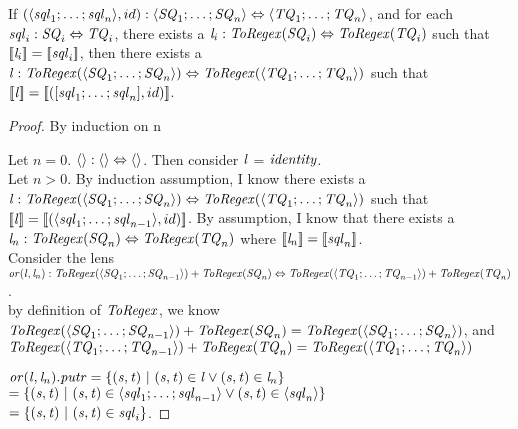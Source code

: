 \begin{lemma}
\label{lem:id-dnf}
If $(\langle\mathit{sql}_1 ; \ldots ; \mathit{sql}_n\rangle,id) :
\langle\mathit{SQ}_1 ; \ldots ; \mathit{SQ}_n\rangle \Leftrightarrow \langle\mathit{TQ}_1 ; \ldots ; \mathit{TQ}_n\rangle$,
and for each $\mathit{sql}_i : \mathit{SQ}_i \Leftrightarrow \mathit{TQ}_i$,
there exists a $\mathit{l}_i : \mathit{ToRegex}(\mathit{SQ}_i) \Leftrightarrow \mathit{ToRegex}(\mathit{TQ}_i)$ such that
$[ \! [\mathit{l}_i] \! ] = [ \! [\mathit{sql}_i] \! ]$,
then there exists a $\mathit{l} : \mathit{ToRegex}(\langle\mathit{SQ}_1 ; \ldots ; \mathit{SQ}_n\rangle) \Leftrightarrow \mathit{ToRegex}(\langle\mathit{TQ}_1 ; \ldots ; \mathit{TQ}_n\rangle)$ such that $[ \! [\mathit{l}] \! ] = [ \! [([\mathit{sql}_1 ; \ldots ; \mathit{sql}_n],id)] \! ]$.
\begin{proof}
By induction on n

Let $n=0$.
$\langle\rangle : \langle\rangle \Leftrightarrow \langle\rangle$.  Then consider $\mathit{l}$ = $\mathit{identity}$.
\\

Let $n>0$.
By induction assumption, I know
there exists a $\mathit{l} : \mathit{ToRegex}(\langle\mathit{SQ}_1 ; \ldots ; \mathit{SQ}_n\rangle) \Leftrightarrow \mathit{ToRegex}(\langle\mathit{TQ}_1 ; \ldots ; \mathit{TQ}_n\rangle)$ such that
$[ \! [\mathit{l}] \! ] = [ \! [(\langle\mathit{sql}_1 ; \ldots ; \mathit{sql}_{n-1}\rangle,id)] \! ]$.
By assumption, I know that there exists a $\mathit{l}_{n} : \mathit{ToRegex}(\mathit{SQ}_{n}) \Leftrightarrow \mathit{ToRegex}(\mathit{TQ}_{n})$
where $[ \! [\mathit{l}_{n}] \! ]=[ \! [\mathit{sql}_{n}] \! ]$.\\
Consider the lens $\mathit{or}(\mathit{l},\mathit{l}_{n}) : \mathit{ToRegex}(\langle\mathit{SQ}_1 ; \ldots ; \mathit{SQ}_{n-1}\rangle)+\mathit{ToRegex}(\mathit{SQ}_{n}) \Leftrightarrow \mathit{ToRegex}(\langle\mathit{TQ}_1 ; \ldots ; \mathit{TQ}_{n-1}\rangle)+\mathit{ToRegex}(\mathit{TQ}_{n})$.\\
by definition of $\mathit{ToRegex}$, we know $\mathit{ToRegex}(\langle\mathit{SQ}_1 ; \ldots ; \mathit{SQ}_{n-1}\rangle)+\mathit{ToRegex}(\mathit{SQ}_{n})=\mathit{ToRegex}(\langle\mathit{SQ}_1;\ldots;\mathit{SQ}_n\rangle)$, and $\mathit{ToRegex}(\langle\mathit{TQ}_1 ; \ldots ; \mathit{TQ}_{n-1}\rangle)+\mathit{ToRegex}(\mathit{TQ}_{n})=\mathit{ToRegex}(\langle\mathit{TQ}_1;\ldots;\mathit{TQ}_n\rangle)$

$\mathit{or}(\mathit{l},\mathit{l}_n).\mathit{putr}=\{(\mathit{s},\mathit{t})~|~
(\mathit{s},\mathit{t})\in\mathit{l}\vee(\mathit{s},\mathit{t})\in\mathit{l}_n\}$\\
$=\{(\mathit{s},\mathit{t})~|~
(\mathit{s},\mathit{t})\in\langle\mathit{sql}_1;\ldots;\mathit{sql}_{n-1}\rangle
\vee(\mathit{s},\mathit{t})\in\langle\mathit{sql}_n\rangle\}$\\
$=\{(\mathit{s},\mathit{t})~|~
(\mathit{s},\mathit{t})\in\mathit{sql}_i\}$.
\end{proof}
\end{lemma}


